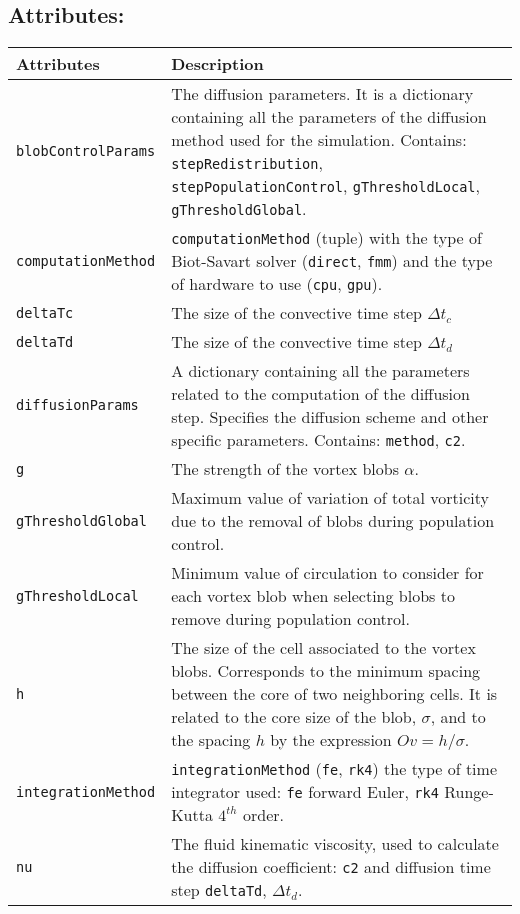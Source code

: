 \subsection*{Attributes:}
\begingroup
\footnotesize
\begin{longtable}{|l|p{12cm}|}
	\hline
	\textbf{Attributes} & \textbf{Description}\\
	\toprule
    \texttt{blobControlParams} 		& The diffusion parameters. It is a dictionary containing all the parameters of the diffusion method used for the simulation. Contains: \texttt{stepRedistribution}, \texttt{stepPopulationControl}, \texttt{gThresholdLocal}, \texttt{gThresholdGlobal}.\\\hline
    \texttt{computationMethod} 		&\texttt{computationMethod} (tuple) with the type of Biot-Savart solver (\texttt{direct}, \texttt{fmm}) and the type of hardware to use (\texttt{cpu}, \texttt{gpu}).\\\hline
    \texttt{deltaTc} & The size of the convective time step $\Delta t_c$\\\hline
    \texttt{deltaTd} & The size of the convective time step $\Delta t_d$\\\hline
    \texttt{diffusionParams} & A dictionary containing all the parameters related to the computation of the diffusion step. Specifies the diffusion scheme and other specific parameters. Contains: \texttt{method}, \texttt{c2}.\\\hline
    \texttt{g} & The strength of the vortex blobs $\alpha$.\\          \hline
    \texttt{gThresholdGlobal} & Maximum value of variation of total vorticity due to the removal of blobs during population control.\\\hline
    \texttt{gThresholdLocal} & Minimum value of circulation to consider for each vortex blob when selecting blobs to remove during population control.\\    \hline      
    \texttt{h} & The size of the cell associated to the vortex blobs. Corresponds to the minimum spacing between the core of two neighboring cells. It is related to the core size of the blob, $\sigma$, and to the spacing $h$ by the expression $Ov = h/\sigma$.\\\hline          
    \texttt{integrationMethod} & \texttt{integrationMethod} (\texttt{fe}, \texttt{rk4}) the type of time integrator used: \texttt{fe} forward Euler, \texttt{rk4} Runge-Kutta $4^{th}$ order.\\ \hline
    \texttt{nu} & The fluid kinematic viscosity, used to calculate the diffusion coefficient: \texttt{c2} and diffusion time step \texttt{deltaTd}, $\Delta t_{d}$.\\          \hline

\end{longtable}
